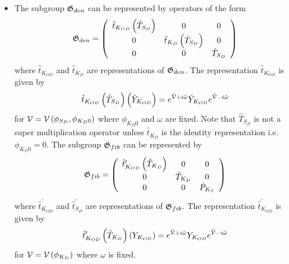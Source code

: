\begin{itemize}
\item The subgroup ${\frak G}_{den}$ can be represented by operators of the
form 
\begin{equation}
{\frak G}_{den}=\left( 
\begin{array}{ccc}
\hat{t}_{K_{OD}}\left( \hat{T}_{S_{D}}\right) & 0 & 0 \\ 
0 & \hat{t}_{K_{D}}\left( \hat{T}_{S_{D}}\right) & 0 \\ 
0 & 0 & \hat{T}_{S_{D}}%
\end{array}%
\right)
\end{equation}%
where $\hat{t}_{K_{OD}}$ and $\hat{t}_{K_{D}}$ are representations of $%
{\frak G}_{den}$. The representation $\hat{t}_{K_{OD}}$ is given by%
\begin{equation}
\hat{t}_{K_{OD}}\left( \hat{T}_{S_{D}}\right) \left( \breve{Y}%
_{K_{OD}}\right) =e^{{\cal \breve{V}+}i\breve{\omega}}\breve{Y}_{K_{OD}}e^{%
{\cal \breve{V}-}i\breve{\omega}}
\end{equation}%
for ${\cal V=V}\left( \phi _{S_{D}},\phi _{K_{D}0}\right) $ where $\phi
_{K_{D}0}$ and $\omega $ are fixed. Note that $\hat{T}_{S_{D}}$ is not a
super multiplication operator unless $\hat{t}_{K_{D}}$ is the identity
representation i.e. $\phi _{K_{D}0}=0$. The subgroup ${\frak G}_{fib}$ can
be represented by 
\begin{equation}
{\frak G}_{fib}=\left( 
\begin{array}{ccc}
\hat{t}_{K_{OD}}^{\prime }\left( \hat{T}_{K_{D}}\right) & 0 & 0 \\ 
0 & \hat{T}_{K_{D}} & 0 \\ 
0 & 0 & \hat{P}_{K_{S}}%
\end{array}%
\right)
\end{equation}%
where $\hat{t}_{K_{OD}}^{\prime }$ and $\hat{t}_{S_{D}}^{\prime }$ are
representations of ${\frak G}_{fib}$. The representation $\hat{t}%
_{K_{OD}}^{\prime }$ is given by 
\begin{equation}
\hat{t}_{K_{OD}}^{\prime }\left( \hat{T}_{K_{D}}\right) \left(
Y_{K_{OD}}\right) =e^{{\cal \breve{V}+}i\breve{\omega}}Y_{K_{OD}}e^{{\cal 
\breve{V}-}i\breve{\omega}}
\end{equation}%
for ${\cal V=V}\left( \phi _{K_{D}}\right) $ where $\omega $ is fixed.


\end{itemize}
